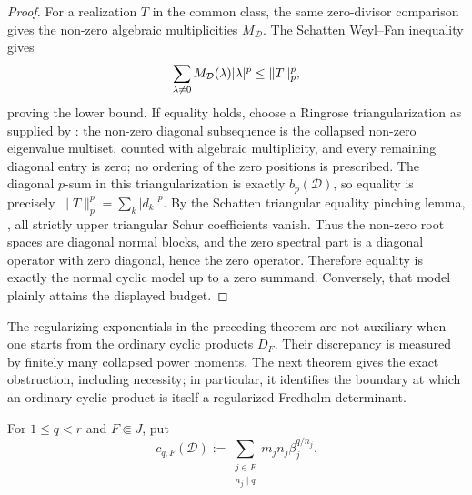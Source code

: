 \begin{proof}
  For a realization \(T\) in the common class, the same zero-divisor comparison gives
  the non-zero algebraic multiplicities \(M_{\mathcal D}\).  The Schatten
  Weyl--Fan inequality gives
  \[
    \sum_{\lambda\ne0}M_{\mathcal D}(\lambda)\lvert \lambda \rvert^{p}
    \le \|T\|_p^p,
  \]
  proving the lower bound.  If equality holds, choose a Ringrose
  triangularization as supplied by :
  the non-zero diagonal subsequence is the collapsed non-zero eigenvalue
  multiset, counted with algebraic multiplicity, and every remaining diagonal
  entry is zero; no ordering of the zero positions is prescribed.  The diagonal
  \(p\)-sum in this triangularization is exactly
  \(b_p(\mathcal D)\), so equality is precisely
  \(\|T\|_p^p=\sum_k|d_k|^p\).  By the Schatten triangular equality pinching
  lemma, , all strictly upper
  triangular Schur coefficients vanish.  Thus the non-zero root spaces are
  diagonal normal blocks, and the zero spectral part is a diagonal operator
  with zero diagonal, hence the zero operator.  Therefore equality is exactly
  the normal cyclic model up to a zero summand.  Conversely, that model plainly
  attains the displayed budget.
\end{proof}

The regularizing exponentials in the preceding theorem are not auxiliary when
one starts from the ordinary cyclic products \(D_F\).  Their discrepancy is
measured by finitely many collapsed power moments.  The next theorem gives the
exact obstruction, including necessity; in particular, it identifies the
boundary at which an ordinary cyclic product is itself a regularized Fredholm
determinant.

For \(1\le q<r\) and \(F\Subset J\), put
\[
  c_{q,F}(\mathcal D)
  :=\sum_{\substack{j\in F\\ n_j\mid q}}
       m_jn_j\beta_j^{q/n_j}.
\]

